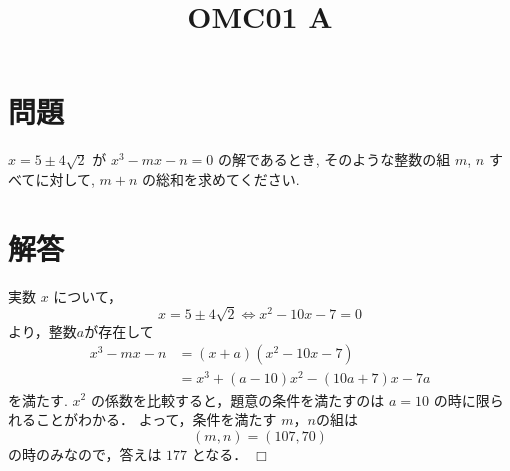 \documentclass[uplatex,dvipdfmx,a4paper]{jsarticle}
\title{OMC01 A}
\date{}
\author{}
\def\qed{\hfill $\Box$}
\newenvironment{question}{\section*{問題}}{}
\newenvironment{solution}{\section*{解答}}{\qed}
\begin{document}
\maketitle
\begin{question}
    $x=5 \pm 4\sqrt{2}$ が $x^3-mx-n=0$  の解であるとき, そのような整数の組 $m$, $n$ すべてに対して, $m+n$ の総和を求めてください.
\end{question}

\begin{solution}
    実数 $x$ について，
    \[
        x = 5 \pm 4 \sqrt{2} \Leftrightarrow x^2-10x-7=0 
    \]
    より，整数$a$が存在して
    \begin{align*}
        x^3-mx-n &= (x+a)(x^2-10x-7) \\
        &= x^3+(a-10)x^2-(10a+7)x-7a       
    \end{align*}
    を満たす.
    $x^2$ の係数を比較すると，題意の条件を満たすのは $a=10$ の時に限られることがわかる．
    よって，条件を満たす $m$，$n$の組は
    \[
        (m, n) = (107, 70)
    \]
    の時のみなので，答えは $177$ となる．
\end{solution}
\end{document}
